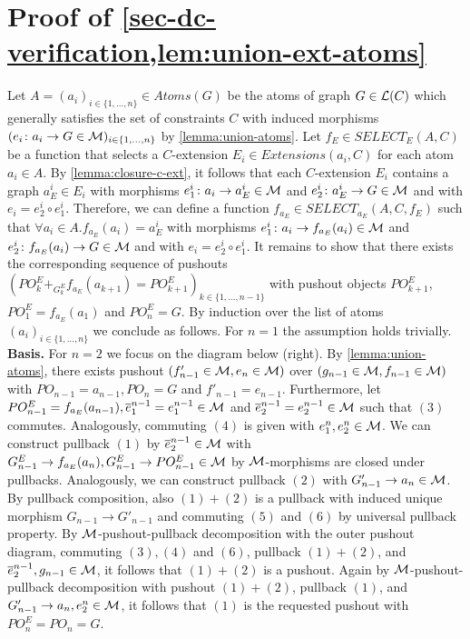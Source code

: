\section{Proof of \cref{sec-dc-verification,lem:union-ext-atoms}}
\label{sec-proofs:lem:union-ext-atoms}
Let $A=(a_i)_{i \in \{1,\ldots,n\}} \in Atoms(G)$ be the atoms of graph $G \in \mathcal{L}(C)$ which generally satisfies the set of constraints $C$ with induced morphisms $(e_i\colon a_i \to G \in {\cal M})_{i \in \{1,\ldots,n\}}$ by \cref{lemma:union-atoms}.
Let $f_E \in SELECT_E(A,C)$ be a function that selects a $C$-extension $E_i \in Extensions(a_i,C)$ for each atom $a_i \in A$.
By \cref{lemma:closure-c-ext}, it follows that each $C$-extension $E_i$ contains a graph $a_E^i \in E_i$ with morphisms $e^i_1\colon a_i \to a_E^i \in {\cal M}$ and $e^i_2\colon a_E^i \to G \in {\cal M}$ and with $e_i=e^i_2 \circ e^i_1$.
Therefore, we can define a function $f_{a_E} \in SELECT_{a_E}(A,C,f_E)$ such that $\forall a_i \in A.f_{a_E}(a_i)=a_E^i$ with morphisms $e^i_1\colon a_i \to f_{a_E}(a_i) \in {\cal M}$ and $e^i_2\colon f_{a_E}(a_i) \to G \in {\cal M}$ and with $e_i=e^i_2 \circ e^i_1$.
It remains to show that there exists the corresponding sequence of pushouts $(PO^E_k +_{G^E_k} f_{a_E}(a_{k+1}) = PO^E_{k+1})_{k \in \{1,\ldots,n-1\}}$ with pushout objects $PO^E_{k+1}$, $PO^E_1=f_{a_E}(a_1)$ and $PO^E_n=G$.
By induction over the list of atoms $(a_i)_{i \in \{1,\ldots,n\}}$ we conclude as follows.
For $n=1$ the assumption holds trivially.
\textbf{Basis.} For $n=2$ we focus on the diagram below (right).
By \cref{lemma:union-atoms}, there exists pushout $(f'_{n-1} \in {\cal M},e_n \in {\cal M})$ over $(g_{n-1} \in {\cal M},f_{n-1} \in {\cal M})$ with $PO_{n-1}=a_{n-1}, PO_n=G$ and $f'_{n-1}=e_{n-1}$.
Furthermore, let $PO^E_{n-1}=f_{a_E}(a_{n-1}), \overline{e}^{n-1}_1=e^{n-1}_1 \in {\cal M}$ and $\overline{e}^{n-1}_2=e^{n-1}_2 \in {\cal M}$ such that $(3)$ commutes.
Analogously, commuting $(4)$ is given with $e^n_1,e^n_2 \in {\cal M}$.
We can construct pullback $(1)$ by $\overline{e}^{n-1}_2 \in {\cal M}$ with $G^E_{n-1} \to f_{a_E}(a_n), G^E_{n-1} \to PO^E_{n-1} \in {\cal M}$ by ${\cal M}$-morphisms are closed under pullbacks.
Analogously, we can construct pullback $(2)$ with $G'_{n-1} \to a_n \in {\cal M}$.
By pullback composition, also $(1)+(2)$ is a pullback with induced unique morphism $G_{n-1} \to G'_{n-1}$ and commuting $(5)$ and $(6)$ by universal pullback property.
By ${\cal M}$-pushout-pullback decomposition with the outer pushout diagram, commuting $(3),(4)$ and $(6)$, pullback $(1)+(2)$, and $\overline{e}^{n-1}_2,g_{n-1} \in {\cal M}$, it follows that $(1)+(2)$ is a pushout.
Again by ${\cal M}$-pushout-pullback decomposition with pushout $(1)+(2)$, pullback $(1)$, and $G'_{n-1} \to a_n,e^n_2 \in {\cal M}$, it follows that $(1)$ is the requested pushout with $PO^E_n=PO_n=G$. \\
